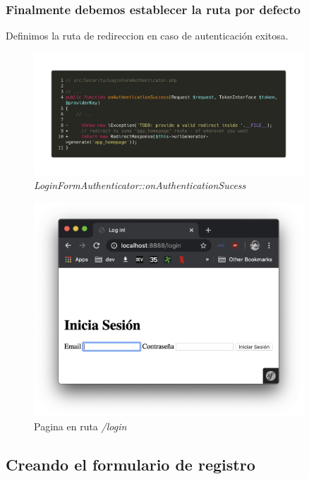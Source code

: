 \subsubsection{Finalmente debemos establecer la ruta por defecto}
Definimos la ruta de redireccion en caso de autenticación exitosa.

\begin{figure}[ht]
  \centering
  \includegraphics[width=0.9\textwidth]{../assets/patch_authenticator.png}
  \caption{\textit{LoginFormAuthenticator::onAuthenticationSucess}}
  \label{fig:patch_authenticator}
\end{figure}

\begin{figure}[ht]
  \centering
  \includegraphics[width=0.9\textwidth]{../assets/login_page.png}
  \caption{Pagina en ruta \textit{/login}}
  \label{fig:login_page}
\end{figure}

\clearpage
\subsection{Creando el formulario de registro}

